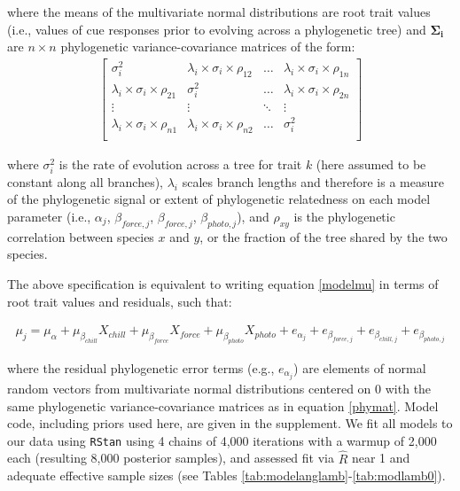 \documentclass[11pt]{article}
\begin{document}
\noindent where the means of the multivariate normal distributions are root trait values (i.e., values of cue responses prior to evolving across a phylogenetic tree) and $\boldsymbol{\Sigma_i}$ %
are $n \times n$ phylogenetic variance-covariance matrices of the form: \\ 
\begin{align}
  \label{phymat}
\begin{bmatrix}
  \sigma^2_i & \lambda_i \times \sigma_{i} \times \rho_{12} & \ldots & \lambda_i \times \sigma_{i} \times \rho_{1n} \\
  \lambda_i \times \sigma_i \times \rho_{21} & \sigma^2_i & \ldots & \lambda_i \times \sigma_{i} \times \rho_{2n} \\
  \vdots & \vdots & \ddots & \vdots \\
  \lambda_i \times \sigma_i \times \rho_{n1} & \lambda_i \times \sigma_i \times \rho_{n2} & \ldots & \sigma^2_i \\
\end{bmatrix}
\end{align}

\noindent where $\sigma_i^2$ is the rate of evolution across a tree for trait $k$ (here assumed to be constant along all branches), $\lambda_i$ scales branch lengths and therefore is a measure of the phylogenetic signal or extent of phylogenetic relatedness on each model parameter (i.e., $\alpha_{j}$, $\beta_{force,j}$, $\beta_{force,j}$, $\beta_{photo,j}$), and $\rho_{xy}$ is the phylogenetic correlation between species $x$ and $y$, or the fraction of the tree shared by the two species.

The above specification is equivalent to writing equation \ref{modelmu} in terms of root trait values and residuals, such that:

\begin{align}
  \label{eqfive}
  \mu_j = \mu_\alpha + \mu_{\beta_{chill}} X_{chill} + \mu_{\beta_{force}} X_{force} + \mu_{\beta_{photo}} X_{photo} + e_{\alpha_{j}} + e_{\beta_{force,j}} + e_{\beta_{chill,j}} + e_{\beta_{photo,j}}
\end{align}

\noindent where the residual phylogenetic error terms (e.g., $e_{\alpha_{j}}$) are elements of normal random vectors from multivariate normal distributions centered on $0$ with the same phylogenetic variance-covariance matrices as in equation \ref{phymat}. Model code, including priors used here, are given in the supplement. We fit all models to our data using \verb|RStan| using 4 chains of 4,000 iterations with a warmup of 2,000 each (resulting 8,000 posterior samples), and assessed fit via $\hat{R}$ near 1 and adequate effective sample sizes (see Tables \ref{tab:modelanglamb}-\ref{tab:modlamb0}). 
\end{document}
